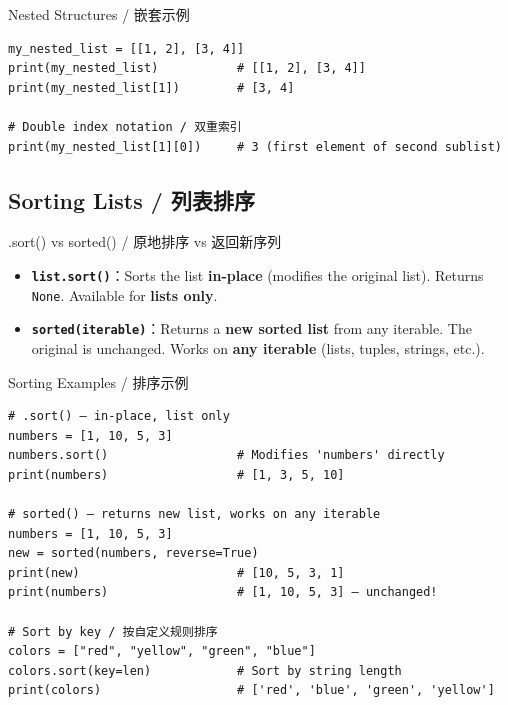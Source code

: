 \documentclass[11pt,a4paper]{report}
\let\oldtexttt\texttt
\renewcommand{\texttt}[1]{\textcolor{mainblue}{\oldtexttt{#1}}}
\begin{document}
\begin{examplebox}{Nested Structures / 嵌套示例}
\begin{lstlisting}
my_nested_list = [[1, 2], [3, 4]]
print(my_nested_list)           # [[1, 2], [3, 4]]
print(my_nested_list[1])        # [3, 4]

# Double index notation / 双重索引
print(my_nested_list[1][0])     # 3 (first element of second sublist)
\end{lstlisting}
\end{examplebox}

\subsection{Sorting Lists / 列表排序}

\begin{concept}{.sort() vs sorted() / 原地排序 vs 返回新序列}
    \begin{itemize}[itemsep=0.5em]
        \item \textbf{\texttt{list.sort()}}：Sorts the list \textbf{in-place} (modifies the original list). Returns \texttt{None}. Available for \textbf{lists only}.
        \item \textbf{\texttt{sorted(iterable)}}：Returns a \textbf{new sorted list} from any iterable. The original is unchanged. Works on \textbf{any iterable} (lists, tuples, strings, etc.).
    \end{itemize}
\end{concept}

\begin{examplebox}{Sorting Examples / 排序示例}
\begin{lstlisting}
# .sort() — in-place, list only
numbers = [1, 10, 5, 3]
numbers.sort()                  # Modifies 'numbers' directly
print(numbers)                  # [1, 3, 5, 10]

# sorted() — returns new list, works on any iterable
numbers = [1, 10, 5, 3]
new = sorted(numbers, reverse=True)
print(new)                      # [10, 5, 3, 1]
print(numbers)                  # [1, 10, 5, 3] — unchanged!

# Sort by key / 按自定义规则排序
colors = ["red", "yellow", "green", "blue"]
colors.sort(key=len)            # Sort by string length
print(colors)                   # ['red', 'blue', 'green', 'yellow']
\end{lstlisting}
\end{examplebox}

\end{document}
